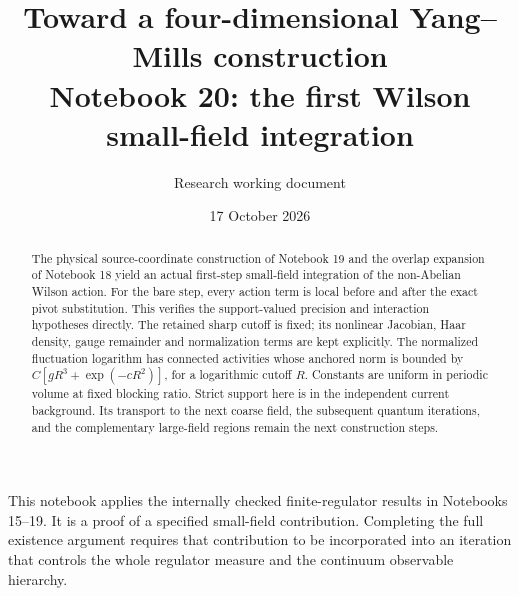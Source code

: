\documentclass[11pt]{article}
\title{Toward a four-dimensional Yang--Mills construction\\
\large Notebook 20: the first Wilson small-field integration}
\author{Research working document}
\date{17 October 2026}
\theoremstyle{remark}
\begin{document}
\maketitle
\begin{abstract}
The physical source-coordinate construction of Notebook 19 and
the overlap expansion of Notebook 18 yield an actual first-step
small-field integration of the non-Abelian Wilson action.
For the bare step, every action term is local before and after
the exact pivot substitution. This verifies the support-valued
precision and interaction hypotheses directly. The retained
sharp cutoff is fixed; its nonlinear Jacobian, Haar density,
gauge remainder and normalization terms are kept explicitly.
The normalized fluctuation logarithm has connected activities
whose anchored norm is bounded by
$C[gR^3+\exp(-cR^2)]$, for a logarithmic cutoff $R$.
Constants are uniform in periodic volume at fixed blocking
ratio. Strict support here is in the independent current
background. Its transport to the next coarse field, the
subsequent quantum iterations, and the complementary
large-field regions remain the next construction steps.
\end{abstract}

This notebook applies the internally checked finite-regulator
results in Notebooks 15--19. It is a proof of a specified
small-field contribution. Completing the full existence
argument requires that contribution to be incorporated into
an iteration that controls the whole regulator measure and
the continuum observable hierarchy.
\end{document}
